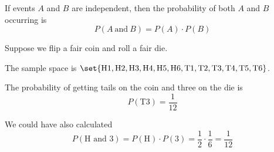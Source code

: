 \documentclass{beamer}
\newcommand{\prob}[1]{P\left(#1\right)}
\begin{document}
\begin{frame}
\begin{definition}
If events $A$ and $B$ are independent, then the probability of both $A$ and $B$ occurring is
\begin{equation*}
\prob{A~\text{and}~B}=\prob{A} \cdot \prob{B}
\end{equation*}
\end{definition}\pause

\begin{example}
Suppose we flip a fair coin and roll a fair die. 

\vspace{2mm}
The sample space is $\set{\text{H1}, \text{H2}, \text{H3}, \text{H4}, \text{H5}, \text{H6}, \text{T1}, \text{T2}, \text{T3}, \text{T4}, \text{T5}, \text{T6}}$.\pause

\vspace{2mm}
The probability of getting tails on the coin and three on the die is 
\begin{equation*}
\prob{\text{T3}}=\dfrac{1}{12}
\end{equation*}\pause

We could have also calculated
\begin{equation*}
\prob{\text{H and 3}} = \prob{\text{H}}\cdot\prob{3} = \dfrac{1}{2}\cdot\dfrac{1}{6} = \dfrac{1}{12}
\end{equation*}
\end{example}
\end{frame}
\end{document}
